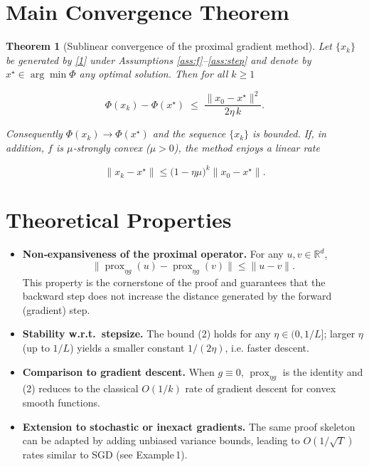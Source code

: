 \documentclass{article}
\newtheorem{theorem}{Theorem}
\newcommand{\prox}{\operatorname{prox}}
\newcommand{\R}{\mathbb{R}}
\begin{document}
\section*{Main Convergence Theorem}
\begin{theorem}[Sublinear convergence of the proximal gradient method]\label{thm:main}
Let $\{x_{k}\}$ be generated by \eqref{1} under Assumptions \ref{ass:f}–\ref{ass:step} and denote by $x^{\star}\in\arg\min\Phi$ any optimal solution. Then for all $k\ge1$  

\[
\Phi(x_{k})-\Phi(x^{\star})\;\le\;\frac{\|x_{0}-x^{\star}\|^{2}}{2\eta\,k}.
\tag{2}
\]

Consequently $\Phi(x_{k})\to\Phi(x^{\star})$ and the sequence $\{x_{k}\}$ is bounded.  
If, in addition, $f$ is $\mu$‑strongly convex ($\mu>0$), the method enjoys a linear rate  

\[
\|x_{k}-x^{\star}\|\le\bigl(1-\eta\mu\bigr)^{k}\|x_{0}-x^{\star}\|.
\tag{3}
\]
\end{theorem}

\section*{Theoretical Properties}
\begin{itemize}[nosep]
\item \textbf{Non‑expansiveness of the proximal operator.} For any $u,v\in\R^{d}$,
\[
\|\prox_{\eta g}(u)-\prox_{\eta g}(v)\|\le\|u-v\|.
\tag{4}
\]
This property is the cornerstone of the proof and guarantees that the backward step does not increase the distance generated by the forward (gradient) step.

\item \textbf{Stability w.r.t.\ stepsize.} The bound (2) holds for any $\eta\in(0,1/L]$; larger $\eta$ (up to $1/L$) yields a smaller constant $1/(2\eta)$, i.e. faster descent.

\item \textbf{Comparison to gradient descent.} When $g\equiv0$, $\prox_{\eta g}$ is the identity and (2) reduces to the classical $O(1/k)$ rate of gradient descent for convex smooth functions.

\item \textbf{Extension to stochastic or inexact gradients.} The same proof skeleton can be adapted by adding unbiased variance bounds, leading to $O(1/\sqrt{T})$ rates similar to SGD (see Example 1).

\end{itemize}
\end{document}
